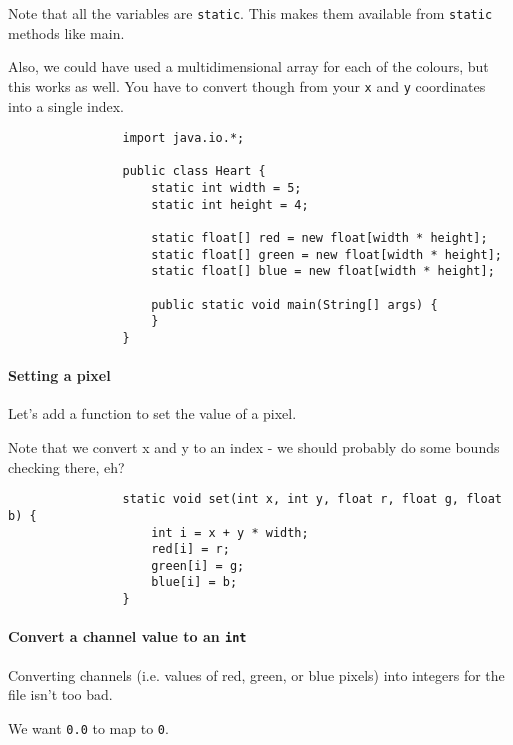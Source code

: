 \documentclass{article}
\begin{document}
            Note that all the variables are \texttt{static}.  This makes them available from \texttt{static} methods like main.
            
            Also, we could have used a multidimensional array for each of the colours, but this works as well. You have to convert though
            from your \texttt{x} and \texttt{y} coordinates into a single index.
            
            \begin{verbatim}
                import java.io.*;
                
                public class Heart {
                    static int width = 5;
                    static int height = 4;
                    
                    static float[] red = new float[width * height];
                    static float[] green = new float[width * height];
                    static float[] blue = new float[width * height];
                    
                    public static void main(String[] args) {
                    }
                }
            \end{verbatim}
        \newpage
        \paragraph{Setting a pixel}
            Let's add a function to set the value of a pixel.

            Note that we convert x and y to an index - we should probably do some bounds checking there, eh?

            \begin{verbatim}
                static void set(int x, int y, float r, float g, float b) {
                    int i = x + y * width;
                    red[i] = r;
                    green[i] = g;
                    blue[i] = b;
                }
            \end{verbatim}
        
        \paragraph{Convert a channel value to an \texttt{int}}
            Converting channels (i.e. values of red, green, or blue pixels) into integers for the file isn't too bad.  
            
            We want \texttt{0.0} to map to \texttt{0}.
            
\end{document}
